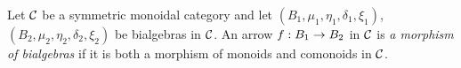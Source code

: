 \begin{definition}
Let ${\mathcal C}$ be a symmetric monoidal category and let $(B_1,\mu_1,\eta_1,\delta_1,\xi_1)$, $(B_2,\mu_2,\eta_2,\delta_2,\xi_2)$ be bialgebras in ${\mathcal C}$. An arrow $f:B_1\rightarrow B_2$ in ${\mathcal C}$ is \textit{a morphism of bialgebras} if it is both a morphism of monoids and comonoids in ${\mathcal C}$.
\end{definition}









































































\small




